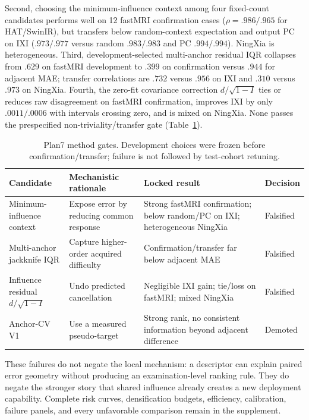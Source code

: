 \documentclass[10pt,twocolumn,letterpaper]{article}
\begin{document}
Second, choosing the minimum-influence context among four fixed-count candidates performs well on 12 fastMRI confirmation cases ($\rho=.986/.965$ for HAT/SwinIR), but transfers below random-context expectation and output PC on IXI ($.973/.977$ versus random $.983/.983$ and PC $.994/.994$). NingXia is heterogeneous. Third, development-selected multi-anchor residual IQR collapses from $.629$ on fastMRI development to $.399$ on confirmation versus $.944$ for adjacent MAE; transfer correlations are $.732$ versus $.956$ on IXI and $.310$ versus $.973$ on NingXia. Fourth, the zero-fit covariance correction $d/\sqrt{1-I}$ ties or reduces raw disagreement on fastMRI confirmation, improves IXI by only $.0011/.0006$ with intervals crossing zero, and is mixed on NingXia. None passes the prespecified non-triviality/transfer gate (Table~\ref{tab:p7-gates}).

\begin{table}[t]
\centering
\caption{Plan7 method gates. Development choices were frozen before confirmation/transfer; failure is not followed by test-cohort retuning.}
\label{tab:p7-gates}
\setlength{\tabcolsep}{4pt}
\begin{tabular}{p{3.2cm}p{3.4cm}p{5.4cm}p{2.0cm}}
\toprule
Candidate&Mechanistic rationale&Locked result&Decision\\
\midrule
Minimum-influence context&Expose error by reducing common response&Strong fastMRI confirmation; below random/PC on IXI; heterogeneous NingXia&Falsified\\
Multi-anchor jackknife IQR&Capture higher-order acquired difficulty&Confirmation/transfer far below adjacent MAE&Falsified\\
Influence residual $d/\sqrt{1-I}$&Undo predicted cancellation&Negligible IXI gain; tie/loss on fastMRI; mixed NingXia&Falsified\\
Anchor-CV V1&Use a measured pseudo-target&Strong rank, no consistent information beyond adjacent difference&Demoted\\
\bottomrule
\end{tabular}
\end{table}

These failures do not negate the local mechanism: a descriptor can explain paired error geometry without producing an examination-level ranking rule. They do negate the stronger story that shared influence already creates a new deployment capability. Complete risk curves, densification budgets, efficiency, calibration, failure panels, and every unfavorable comparison remain in the supplement.
\end{document}

